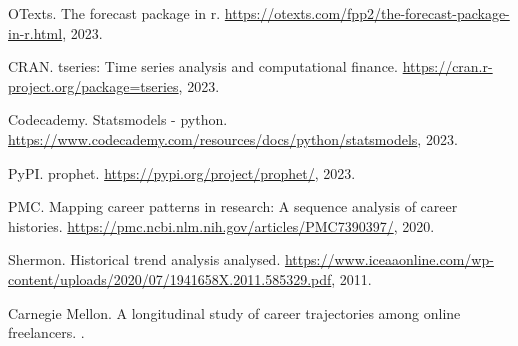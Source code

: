 \documentclass[../main.tex]{subfiles}
\begin{document}
\begin{thebibliography}{99}
OTexts.
\newblock The forecast package in r.
\newblock \url{https://otexts.com/fpp2/the-forecast-package-in-r.html}, 2023.

CRAN.
\newblock tseries: Time series analysis and computational finance.
\newblock \url{https://cran.r-project.org/package=tseries}, 2023.

Codecademy.
\newblock Statsmodels - python.
\newblock \url{https://www.codecademy.com/resources/docs/python/statsmodels}, 2023.

PyPI.
\newblock prophet.
\newblock \url{https://pypi.org/project/prophet/}, 2023.

PMC.
\newblock Mapping career patterns in research: A sequence analysis of career histories.
\newblock \url{https://pmc.ncbi.nlm.nih.gov/articles/PMC7390397/}, 2020.

Shermon.
\newblock Historical trend analysis analysed.
\newblock \url{https://www.iceaaonline.com/wp-content/uploads/2020/07/1941658X.2011.585329.pdf}, 2011.

Carnegie Mellon.
\newblock A longitudinal study of career trajectories among online freelancers.
.

\end{thebibliography}
\end{document}
